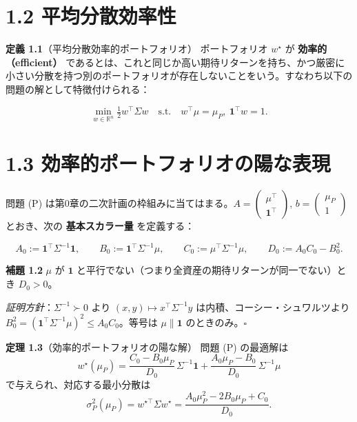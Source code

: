 \documentclass[11pt,a4paper]{report}
\begin{document}
\section{1.2 平均分散効率性}

\textbf{定義 1.1}（平均分散効率的ポートフォリオ） ポートフォリオ $w^\star$ が \textbf{効率的（efficient）} であるとは、これと同じか高い期待リターンを持ち、かつ厳密に小さい分散を持つ別のポートフォリオが存在しないことをいう。すなわち以下の問題の解として特徴付けられる：

\[ \min_{w \in \mathbb{R}^n} \tfrac{1}{2} w^\top \Sigma w \quad \text{s.t.}\quad w^\top \mu = \mu_P,\ \mathbf{1}^\top w = 1. \tag{P} \]

\section{1.3 効率的ポートフォリオの陽な表現}

問題 (P) は第0章の二次計画の枠組みに当てはまる。$A = \begin{pmatrix} \mu^\top \\ \mathbf{1}^\top \end{pmatrix}$, $b = \begin{pmatrix} \mu_P \\ 1 \end{pmatrix}$ とおき、次の \textbf{基本スカラー量} を定義する：

\[ A_0 := \mathbf{1}^\top \Sigma^{-1} \mathbf{1}, \qquad B_0 := \mathbf{1}^\top \Sigma^{-1} \mu, \qquad C_0 := \mu^\top \Sigma^{-1} \mu, \qquad D_0 := A_0 C_0 - B_0^2. \]

\textbf{補題 1.2} $\mu$ が $\mathbf{1}$ と平行でない（つまり全資産の期待リターンが同一でない）とき $D_0 > 0$。

\emph{証明方針}：$\Sigma^{-1} \succ 0$ より $(x, y) \mapsto x^\top \Sigma^{-1} y$ は内積、コーシー・シュワルツより $B_0^2 = (\mathbf{1}^\top \Sigma^{-1} \mu)^2 \le A_0 C_0$。等号は $\mu \parallel \mathbf{1}$ のときのみ。$\square$

\textbf{定理 1.3}（効率的ポートフォリオの陽な解） 問題 (P) の最適解は \[ \boxed{\; w^\star(\mu_P) = \frac{C_0 - B_0 \mu_P}{D_0}\, \Sigma^{-1} \mathbf{1} + \frac{A_0 \mu_P - B_0}{D_0}\, \Sigma^{-1} \mu \;} \] で与えられ、対応する最小分散は \[ \sigma_P^2(\mu_P) = w^{\star\top} \Sigma w^\star = \frac{A_0 \mu_P^2 - 2 B_0 \mu_P + C_0}{D_0}. \tag{1.1} \]
\end{document}
